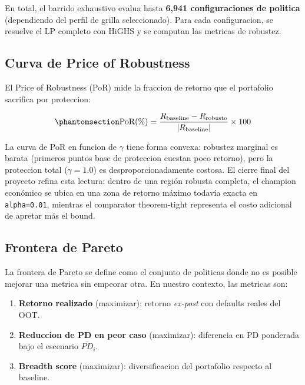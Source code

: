\documentclass[
  spanish,
  11pt,
  letterpaper,
]{scrbook}
\providecommand{\tightlist}{%
  \setlength{\itemsep}{0pt}\setlength{\parskip}{0pt}}
\theoremstyle{plain}
\theoremstyle{remark}
\begin{document}
En total, el barrido exhaustivo evalua hasta \textbf{6,941
configuraciones de politica} (dependiendo del perfil de grilla
seleccionado). Para cada configuracion, se resuelve el LP completo con
HiGHS y se computan las metricas de robustez.

\subsection{Curva de Price of
Robustness}\label{curva-de-price-of-robustness}

El Price of Robustness (PoR) mide la fraccion de retorno que el
portafolio sacrifica por proteccion:

\begin{equation}\protect\phantomsection\label{eq-price-of-robustness}{
\text{PoR}(\%) = \frac{R_{\text{baseline}} - R_{\text{robusto}}}{|R_{\text{baseline}}|} \times 100
}\end{equation}

La curva de PoR en funcion de \(\gamma\) tiene forma convexa: robustez
marginal es barata (primeros puntos base de proteccion cuestan poco
retorno), pero la proteccion total (\(\gamma = 1.0\)) es
desproporcionadamente costosa. El cierre final del proyecto refina esta
lectura: dentro de una región robusta completa, el champion económico se
ubica en una zona de retorno máximo todavía exacta en
\texttt{alpha=0.01}, mientras el comparator theorem-tight representa el
costo adicional de apretar más el bound.

\subsection{Frontera de Pareto}\label{frontera-de-pareto}

La frontera de Pareto se define como el conjunto de politicas donde no
es posible mejorar una metrica sin empeorar otra. En nuestro contexto,
las metricas son:

\begin{enumerate}
\def\labelenumi{\arabic{enumi}.}
\tightlist
\item
  \textbf{Retorno realizado} (maximizar): retorno \emph{ex-post} con
  defaults reales del OOT.
\item
  \textbf{Reduccion de PD en peor caso} (maximizar): diferencia en PD
  ponderada bajo el escenario \(\overline{PD}_i\).
\item
  \textbf{Breadth score} (maximizar): diversificacion del portafolio
  respecto al baseline.
\end{enumerate}
\end{document}
